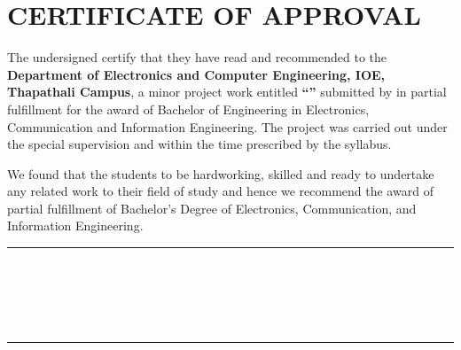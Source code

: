 
\chapter*{CERTIFICATE OF APPROVAL}
{}

\noindent The undersigned certify that they have read and recommended to the
\textbf{Department of Electronics and Computer Engineering, IOE, Thapathali Campus},
a minor project work entitled \textbf{``\cTitle''} submitted by
\textbf{\authorList} in partial fulfillment for the award of Bachelor of
Engineering in Electronics, Communication and Information Engineering.
The project was carried out under the special supervision and within the time
prescribed by the syllabus.

\vspace{1em}

We found that the students to be hardworking, skilled and ready to undertake
any related work to their field of study and hence we recommend the award of
partial fulfillment of Bachelor's Degree of Electronics, Communication, and
Information Engineering.

\vspace{2em}

\noindent
\begin{minipage}[t]{0.48\textwidth}
    \rule{6cm}{0.2mm} \\
    \cSupervisorTitle \\
    \cSupervisor \\
    \cSupervisorDept \\
    \cSupervisorAddress
\end{minipage}
\hfill
\begin{minipage}[t]{0.48\textwidth}
    \rule{6cm}{0.2mm} \\
    \cExternalExaminerTitle \\
\end{minipage}

\vspace{3em}

